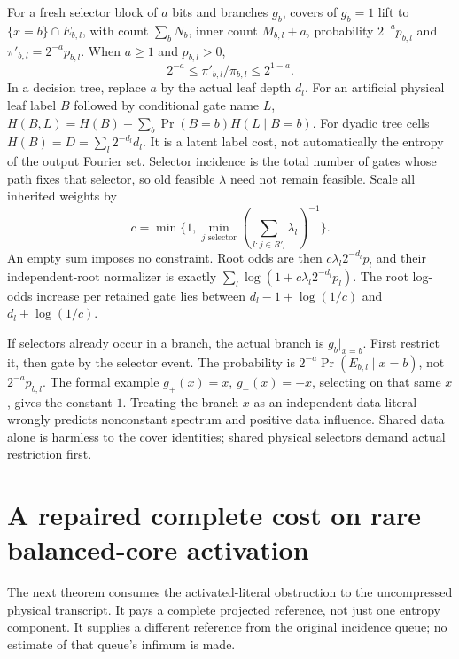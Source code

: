 \documentclass{article}
\begin{document}
For a fresh selector block of $a$ bits and branches $g_b$, covers of
$g_b=1$ lift to $\{x=b\}\cap E_{b,l}$, with count $\sum_bN_b$,
inner count $M_{b,l}+a$, probability $2^{-a}p_{b,l}$ and
$\pi'_{b,l}=2^{-a}p_{b,l}$. When $a\ge1$ and $p_{b,l}>0$,
\[
 2^{-a}\le\pi'_{b,l}/\pi_{b,l}\le2^{1-a}.
\]
In a decision tree, replace $a$ by the actual leaf depth $d_l$.
For an artificial physical leaf label $B$ followed by conditional gate
name $L$, $H(B,L)=H(B)+\sum_b\Pr(B=b)H(L\mid B=b)$.
For dyadic tree cells $H(B)=D=\sum_l2^{-d_l}d_l$.
It is a latent label cost, not automatically the entropy of the output
Fourier set. Selector incidence is the total number of gates whose
path fixes that selector, so old feasible $\lambda$ need not remain
feasible. Scale all inherited weights by
\[
 c=\min\{1,\min_{j\text{ selector}}(
                  \sum_{l:j\in R'_l}\lambda_l)^{-1}\}.
\]
An empty sum imposes no constraint. Root odds are then
$c\lambda_l2^{-d_l}p_l$ and their independent-root normalizer is
exactly $\sum_l\log(1+c\lambda_l2^{-d_l}p_l)$.
The root log-odds increase per retained gate lies between
$d_l-1+\log(1/c)$ and $d_l+\log(1/c)$.

If selectors already occur in a branch, the actual branch is
$g_b|_{x=b}$. First restrict it, then gate by the selector event.
The probability is $2^{-a}\Pr(E_{b,l}\mid x=b)$, not $2^{-a}p_{b,l}$.
The formal example $g_+(x)=x$, $g_-(x)=-x$, selecting on that same $x$,
gives the constant $1$. Treating the branch $x$ as an independent data
literal wrongly predicts nonconstant spectrum and positive data
influence. Shared data alone is harmless to the cover identities;
shared physical selectors demand actual restriction first.

\section{A repaired complete cost on rare balanced-core activation}
The next theorem consumes the activated-literal obstruction to the
uncompressed physical transcript. It pays a complete projected reference,
not just one entropy component. It supplies a different reference from
the original incidence queue; no estimate of that queue's infimum is made.
\end{document}
